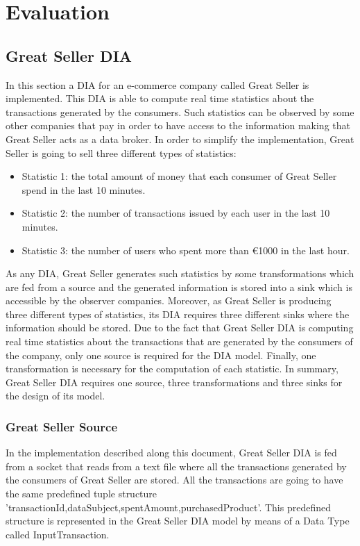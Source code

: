 \chapter[Chapter 5]{Evaluation}
\label{sec:chapter5}

\section{Great Seller DIA}

In this section a DIA for an e-commerce company called Great Seller is implemented. This DIA is able to compute real time statistics about the transactions generated by the consumers. Such statistics can be observed by some other companies that pay in order to have access to the information making that Great Seller acts as a data broker. In order to simplify the implementation, Great Seller is going to sell three different types of statistics:

\begin{itemize}

\item Statistic 1: the total amount of money that each consumer of Great Seller spend in the last 10 minutes.
\item Statistic 2: the number of transactions issued by each user in the last 10 minutes.
\item Statistic 3: the number of users who spent more than \euro{1000} in the last hour.

\end{itemize}

As any DIA, Great Seller generates such statistics by some transformations which are fed from a source and the generated information is stored into a sink which is accessible by the observer companies. Moreover, as Great Seller is producing three different types of statistics, its DIA requires three different sinks where the information should be stored. Due to the fact that Great Seller DIA is computing real time statistics about the transactions that are generated by the consumers of the company, only one source is required for the DIA model. Finally, one transformation is necessary for the computation of each statistic. In summary, Great Seller DIA requires one source, three transformations and three sinks for the design of its model.

\subsection{Great Seller Source}
In the implementation described along this document, Great Seller DIA is fed from a socket that reads from a text file where all the transactions generated by the consumers of Great Seller are stored. All the transactions are going to have the same predefined tuple structure 'transactionId,dataSubject,spentAmount,purchasedProduct'. This predefined structure is represented in the Great Seller DIA model by means of a Data Type called InputTransaction.

